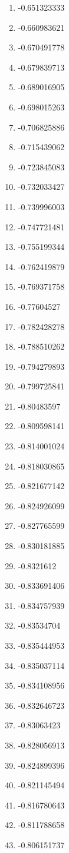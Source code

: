 \documentclass[6pt]{article}
\begin{document}
\begin{multicols}{4}
\begin{enumerate}
		\item -0.651323333
		\item -0.660983621
		\item -0.670491778
		\item -0.679839713
		\item -0.689016905
		\item -0.698015263
		\item -0.706825886
		\item -0.715439062
		\item -0.723845083
		\item -0.732033427
		\item -0.739996003
		\item -0.747721481
		\item -0.755199344
		\item -0.762419879
		\item -0.769371758
		\item -0.77604527
		\item -0.782428278
		\item -0.788510262
		\item -0.794279893
		\item -0.799725841
		\item -0.80483597
		\item -0.809598141
		\item -0.814001024
		\item -0.818030865
		\item -0.821677142
		\item -0.824926099
		\item -0.827765599
		\item -0.830181885
		\item -0.8321612
		\item -0.833691406
		\item -0.834757939
		\item -0.83534704
		\item -0.835444953
		\item -0.835037114
		\item -0.834108956
		\item -0.832646723
		\item -0.83063423
		\item -0.828056913
		\item -0.824899396
		\item -0.821145494
		\item -0.816780643
		\item -0.811788658
		\item -0.806151737

\end{enumerate}
\end{multicols}
\end{document}
